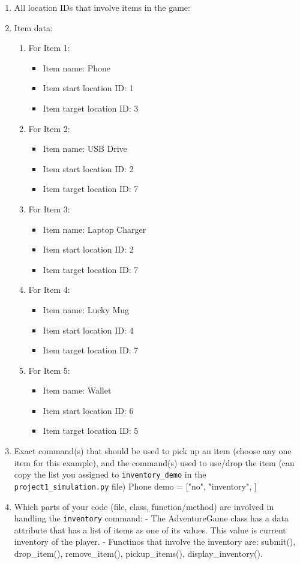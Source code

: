 \documentclass[11pt]{article}
\begin{document}
\begin{enumerate}
\item All location IDs that involve items in the game:

\item Item data:
\begin{enumerate}
    \item For Item 1:
    \begin{itemize}
    \item Item name: Phone
    \item Item start location ID: 1
    \item Item target location ID: 3
    \end{itemize}
        \item For Item 2:
    \begin{itemize}
    \item Item name: USB Drive
    \item Item start location ID: 2
    \item Item target location ID: 7
    \end{itemize}
        \item For Item 3:
    \begin{itemize}
    \item Item name: Laptop Charger
    \item Item start location ID: 2
    \item Item target location ID: 7
    \end{itemize}
        \item For Item 4:
    \begin{itemize}
    \item Item name: Lucky Mug
    \item Item start location ID: 4
    \item Item target location ID: 7
    \end{itemize}
        \item For Item 5:
    \begin{itemize}
    \item Item name: Wallet
    \item Item start location ID: 6
    \item Item target location ID: 5
    \end{itemize}
\end{enumerate}

    \item Exact command(s) that should be used to pick up an item (choose any one item for this example), and the command(s) used to use/drop the item (can copy the list you assigned to \texttt{inventory\_demo} in the \texttt{project1\_simulation.py} file)
        Phone demo = ["no", "inventory", ]
    \item Which parts of your code (file, class, function/method) are involved in handling the \texttt{inventory} command:
        - The AdventureGame class has a data attribute that has a list of items as one of its values. This value is current inventory of the player.
        - Functinos that involve the inventory are: submit(), drop_item(), remove_item(), pickup_items(), display_inventory().
\end{enumerate}
\end{document}
